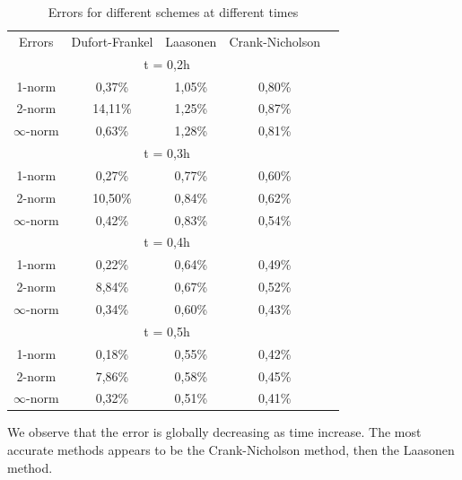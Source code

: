 \documentclass{article}
\begin{document}
        \begin{table}[H]
            \centering
            \caption{Errors for different schemes at different times}
            \begin{tabular}{|c|c|c|c|l}
            \cline{1-4}
            Errors & Dufort-Frankel & Laasonen & Crank-Nicholson &  \\ \cline{1-4}
            \multicolumn{4}{|c|}{t = 0,2h}                       &  \\ \cline{1-4}
            1-norm & 0,37\%         & 1,05\%   & 0,80\%          &  \\ \cline{1-4}
            2-norm & 14,11\%        & 1,25\%   & 0,87\%          &  \\ \cline{1-4}
            $\infty$-norm  & 0,63\%         & 1,28\%   & 0,81\%          &  \\ \cline{1-4}
            \multicolumn{4}{|c|}{t = 0,3h}                       &  \\ \cline{1-4}
            1-norm & 0,27\%         & 0,77\%   & 0,60\%          &  \\ \cline{1-4}
            2-norm & 10,50\%        & 0,84\%   & 0,62\%          &  \\ \cline{1-4}
            $\infty$-norm  & 0,42\%         & 0,83\%   & 0,54\%          &  \\ \cline{1-4}
            \multicolumn{4}{|c|}{t = 0,4h}                       &  \\ \cline{1-4}
            1-norm & 0,22\%         & 0,64\%   & 0,49\%          &  \\ \cline{1-4}
            2-norm & 8,84\%        & 0,67\%   & 0,52\%          &  \\ \cline{1-4}
            $\infty$-norm  & 0,34\%         & 0,60\%   & 0,43\%          &  \\ \cline{1-4}
            \multicolumn{4}{|c|}{t = 0,5h}                       &  \\ \cline{1-4}
            1-norm & 0,18\%         & 0,55\%   & 0,42\%          &  \\ \cline{1-4}
            2-norm & 7,86\%        & 0,58\%   & 0,45\%          &  \\ \cline{1-4}
            $\infty$-norm  & 0,32\%         & 0,51\%   & 0,41\%          &  \\ \cline{1-4}
            \end{tabular}
        \end{table}

        We observe that the error is globally decreasing as time increase. The most accurate methods appears to 
        be the Crank-Nicholson method, then the Laasonen method.
\end{document}
